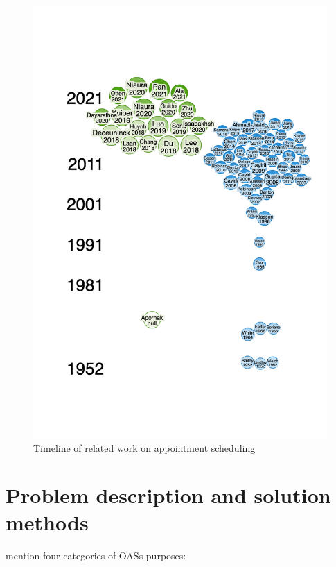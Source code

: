 \documentclass[
  10pt,
  letterpaper,
]{article}
\begin{document}
\begin{figure}

{\centering \includegraphics{images/timeline articles.png}

}

\caption{Timeline of related work on appointment scheduling}

\end{figure}

\hypertarget{problem-description-and-solution-methods}{%
\section{Problem description and solution
methods}\label{problem-description-and-solution-methods}}

\citep{ala_appointment_2022} mention four categories of OASs purposes:
\end{document}
